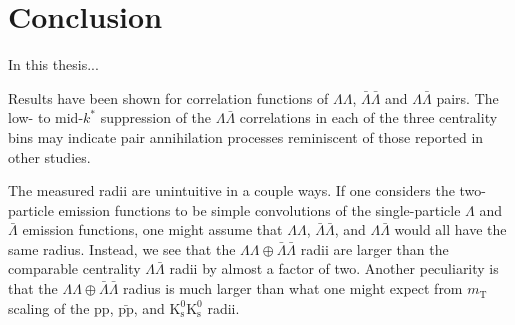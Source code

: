 \section{Conclusion}
\label{sec:Conclusion}

In this thesis...


Results have been shown for correlation functions of $\Lambda\Lambda$, $\bar{\Lambda}\bar{\Lambda}$ and $\Lambda\bar{\Lambda}$ pairs.  
The low- to mid-$k^*$ suppression of the $\Lambda\bar{\Lambda}$ correlations in each of the three centrality bins may indicate pair annihilation processes reminiscent of those reported in other studies.




The measured radii are unintuitive in a couple ways.
If one considers the two-particle emission functions to be simple convolutions of the single-particle $\Lambda$ and $\bar{\Lambda}$ emission functions, one might assume that $\Lambda\Lambda$, $\bar{\Lambda}\bar{\Lambda}$, and $\Lambda\bar{\Lambda}$ would all have the same radius.
Instead, we see that the $\Lambda\Lambda\oplus\bar{\Lambda}\bar{\Lambda}$ radii are larger than the comparable centrality $\Lambda\bar{\Lambda}$ radii by almost a factor of two.
Another peculiarity is that the $\Lambda\Lambda\oplus\bar{\Lambda}\bar{\Lambda}$ radius is much larger than what one might expect from $m_\mathrm{T}$ scaling of the $\mathrm{pp}$, $\mathrm{\bar{pp}}$, and $\mathrm{K^0_s}\mathrm{K^0_s}$ radii.



